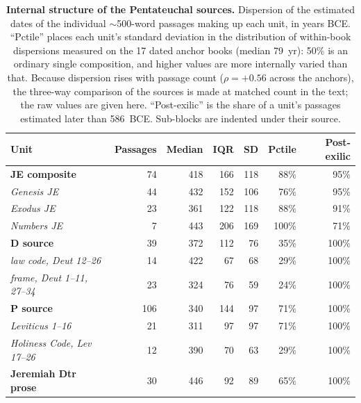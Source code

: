 \begin{table}[!ht]
\centering
\footnotesize
\caption{{\bf Internal structure of the Pentateuchal sources.}  Dispersion of the estimated dates of the individual $\sim$500-word passages making up each unit, in years BCE.  ``Pctile'' places each unit's standard deviation in the distribution of within-book dispersions measured on the 17 dated anchor books (median 79~yr): 50\% is an ordinary single composition, and higher values are more internally varied than that.  Because dispersion rises with passage count ($\rho = +0.56$ across the anchors), the three-way comparison of the sources is made at matched count in the text; the raw values are given here.  ``Post-exilic'' is the share of a unit's passages estimated later than 586~BCE.  Sub-blocks are indented under their source.}
\label{tab:layers}
\begin{tabular}{lrrrrrr}
\toprule
\textbf{Unit} & \textbf{Passages} & \textbf{Median} & \textbf{IQR} & \textbf{SD} & \textbf{Pctile} & \textbf{Post-exilic} \\
\midrule
\textbf{JE composite} & 74 & 418 & 166 & 118 & 88\% & 95\% \\
\hspace{1.5em}\textit{Genesis JE} & 44 & 432 & 152 & 106 & 76\% & 95\% \\
\hspace{1.5em}\textit{Exodus JE} & 23 & 361 & 122 & 118 & 88\% & 91\% \\
\hspace{1.5em}\textit{Numbers JE} & 7 & 443 & 206 & 169 & 100\% & 71\% \\
\textbf{D source} & 39 & 372 & 112 & 76 & 35\% & 100\% \\
\hspace{1.5em}\textit{law code, Deut 12--26} & 14 & 422 & 67 & 68 & 29\% & 100\% \\
\hspace{1.5em}\textit{frame, Deut 1--11, 27--34} & 23 & 324 & 76 & 59 & 24\% & 100\% \\
\textbf{P source} & 106 & 340 & 144 & 97 & 71\% & 100\% \\
\hspace{1.5em}\textit{Leviticus 1--16} & 21 & 311 & 97 & 97 & 71\% & 100\% \\
\hspace{1.5em}\textit{Holiness Code, Lev 17--26} & 12 & 390 & 70 & 63 & 29\% & 100\% \\
\textbf{Jeremiah Dtr prose} & 30 & 446 & 92 & 89 & 65\% & 100\% \\
\bottomrule
\end{tabular}
\end{table}
